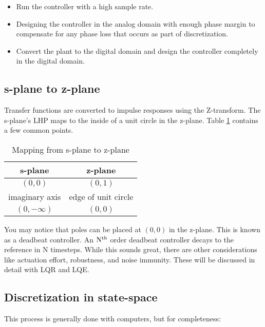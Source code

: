 \begin{itemize}
  \item Run the controller with a high sample rate.
  \item Designing the controller in the analog domain with enough phase margin
    to compensate for any phase loss that occurs as part of discretization.
  \item Convert the \gls{plant} to the digital domain and design the controller
    completely in the digital domain.
\end{itemize}

\subsection{s-plane to z-plane}

Transfer functions are converted to impulse responses using the Z-transform. The
s-plane's LHP maps to the inside of a unit circle in the z-plane. Table
\ref{tab:s-plane2z-plane} contains a few common points. \\

\begin{table}
  \caption{Mapping from s-plane to z-plane}
  \renewcommand{\arraystretch}{1.3}
  \centering
  \begin{tabular}{|cc|}
    \hline
    \rowcolor{lightblue}
    \textbf{s-plane} & \textbf{z-plane} \\
    \hline
    $(0, 0)$ & $(0, 1)$ \\
    imaginary axis & edge of unit circle \\
    $(0, -\infty)$ & $(0, 0)$ \\
    \hline
  \end{tabular}
  \label{tab:s-plane2z-plane}
\end{table}

You may notice that poles can be placed at $(0, 0)$ in the z-plane. This is
known as a deadbeat controller. An $\rm N^{th}$ order deadbeat controller decays
to the \gls{reference} in N timesteps. While this sounds great, there are other
considerations like actuation effort, \gls{robustness}, and
\gls{noise immunity}. These will be discussed in detail with LQR and LQE.

\subsection{Discretization in state-space}

This process is generally done with computers, but for completeness:

